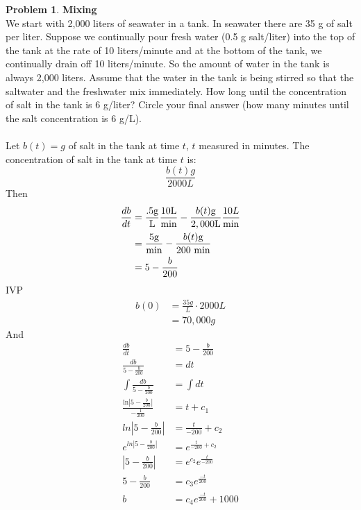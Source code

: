 \documentclass[10pt,leqno ]{article}
\theoremstyle{definition}
\newtheorem{problem}[theorem]{Problem}
\begin{document}
\begin{problem} \textbf{Mixing} \\
We start with 2,000 liters of seawater in a tank. In seawater there are 35 g of salt per liter. Suppose we continually pour fresh water (0.5 g salt/liter) into the top of the tank at the rate of 10 liters/minute and at the bottom of the tank, we continually drain off 10 liters/minute. So the amount of water in the tank is always 2,000 liters. Assume that the water in the tank is being stirred so that the saltwater and the freshwater mix immediately. How long until the concentration of salt in the tank is 6 g/liter? Circle your final answer (how many minutes until the salt concentration is 6 g/L).
\\\\
Let $b(t) =g$ of salt in the tank at time $t$, $t$ measured in minutes.  The concentration of salt in the tank at time $t$ is:
\begin{equation*}
\frac{b(t) g}{2000 L}
\end{equation*}
Then
\begin{align*}
\frac{db}{dt} &= \frac{.5 \text{g}}{\text{L}} \frac{10 \text{L}}{\text{min}} - \frac{b(t) \text{g}}{2,000 \text{\text{L}}}  \frac{10 L}{\text{min}}\\
                    &= \frac{5 \text{g}}{\text{min}} - \frac{b(t) \text{g}}{200 \text{ min}}\\
                    &= 5 - \frac{b}{200}
\end{align*}
IVP
\begin{align*}
b(0) &= \frac{35 g}{L} \cdot 2000 L \\
       &= 70,000g
\end{align*}
And
\begin{align*}
\frac{db}{dt} &= 5 - \frac{b}{200} \\
\frac{db}{5 - \frac{b}{200}} &= dt \\
\int \frac{db}{5 - \frac{b}{200}} &= \int dt \\
\frac{\text{ln} |5 - \frac{b}{200}| }{-\frac{1}{200}} &= t + c_1 \\
ln| 5 - \frac{b}{200}| &= \frac{t}{-200} + c_2 \\
e^{ln| 5 - \frac{b}{200}|} &= e^{\frac{t}{-200} + c_2 } \\
| 5 - \frac{b}{200}| &= e^{c_2}e^\frac{t}{-200}  \\ 
5 - \frac{b}{200} &= c_3 e^\frac{-t}{200}  \\
b &= c_4 e^{\frac{-t}{200}} + 1000
\end{align*}

\end{problem}
\end{document}
